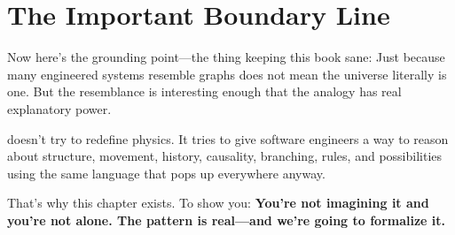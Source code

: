 \section*{The Important Boundary Line}
Now here's the grounding point—the thing keeping this book sane: Just because many engineered systems resemble graphs does not mean the universe literally is one. But the resemblance is interesting enough that the analogy has real explanatory power.

\COMPUTER{} doesn't try to redefine physics. It tries to give software engineers a way to reason about structure, movement, history, causality, branching, rules, and possibilities using the same language that pops up everywhere anyway.

That's why this chapter exists. To show you: \textbf{You're not imagining it and you're not alone. The pattern is real—and we're going to formalize it.}